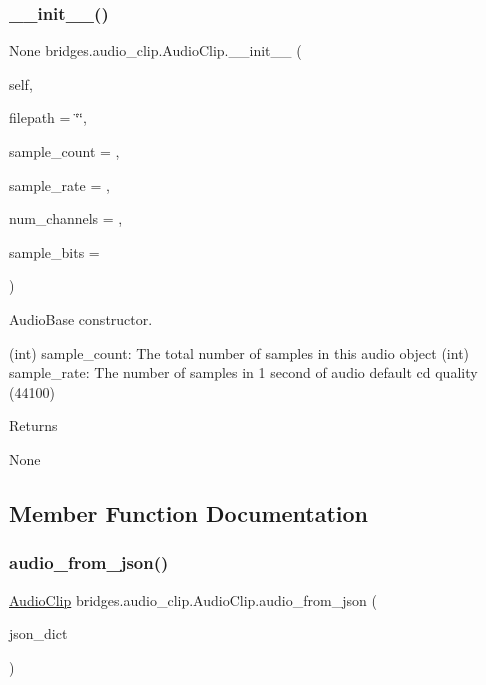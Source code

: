 \subsubsection{\texorpdfstring{\_\_init\_\_()}{\_\_init\_\_()}}
{\footnotesize\ttfamily  None bridges.\+audio\+\_\+clip.\+Audio\+Clip.\+\_\+\+\_\+init\+\_\+\+\_\+ (\begin{DoxyParamCaption}\item[{}]{self,  }\item[{str}]{filepath = {\ttfamily \char`\"{}\char`\"{}},  }\item[{int}]{sample\+\_\+count = {},  }\item[{int}]{sample\+\_\+rate = {},  }\item[{int}]{num\+\_\+channels = {},  }\item[{int}]{sample\+\_\+bits = {} }\end{DoxyParamCaption})}



Audio\+Base constructor. 

\begin{DoxyVerb}       (int) sample_count: The total number of samples in this audio object
       (int) sample_rate: The number of samples in 1 second of audio default cd quality (44100)
\end{DoxyVerb}
 \begin{DoxyReturn}{Returns}


None 
\end{DoxyReturn}


\subsection{Member Function Documentation}
\mbox{\label{classbridges_1_1audio__clip_1_1_audio_clip_a573832e46c882be0d3be0be63c272e2c}} 
\subsubsection{\texorpdfstring{audio\_from\_json()}{audio\_from\_json()}}
{\footnotesize\ttfamily  \textquotesingle{}\mbox{\hyperlink{classbridges_1_1audio__clip_1_1_audio_clip}{Audio\+Clip}}\textquotesingle{} bridges.\+audio\+\_\+clip.\+Audio\+Clip.\+audio\+\_\+from\+\_\+json (\begin{DoxyParamCaption}\item[{dict}]{json\+\_\+dict }\end{DoxyParamCaption})}



